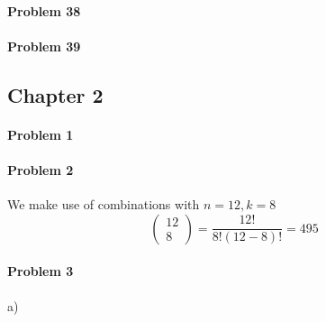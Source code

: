 \paragraph{Problem 38}
\paragraph{Problem 39}

\pagebreak
\subsection{Chapter 2}
\paragraph{Problem 1}
\paragraph{Problem 2}
We make use of combinations with $n=12,k=8$
\[
    \begin{pmatrix}12\\8\end{pmatrix}=\frac{12!}{8!(12-8)!}=495
\]
\paragraph{Problem 3}
a)

